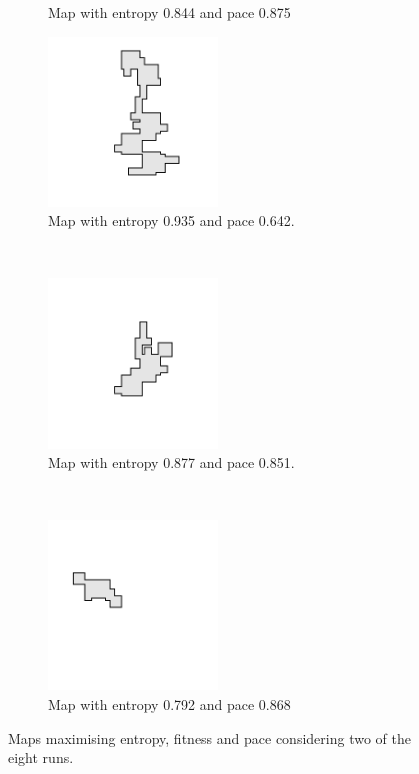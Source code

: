 \begin{figure}[hbtp]
\begin{subfigure}[t]{0.3\textwidth}
        \caption{Map with entropy 0.844 and pace 0.875}
        \label{fig:ex_two_best_pace_map_0}
    \end{subfigure}
    \centering
    \begin{subfigure}[t]{0.3\textwidth}
        \centering
        \includegraphics[height=4.5cm]{Images/images/experiment_two/best_entropy_pop_1/map.png}
        \caption{Map with entropy 0.935 and pace 0.642.}
        \label{fig:ex_two_best_entropy_map_1}
    \end{subfigure}%
    ~ 
    \begin{subfigure}[t]{0.3\textwidth}
        \centering
        \includegraphics[height=4.5cm]{Images/images/experiment_two/best_fitness_pop_1/map.png}
        \caption{Map with entropy 0.877 and pace 0.851.}
        \label{fig:ex_two_best_fitness_map_1}
    \end{subfigure}
    ~ 
    \begin{subfigure}[t]{0.3\textwidth}
        \centering
        \includegraphics[height=4.5cm]{Images/images/experiment_two/best_pace_pop_1/map.png}
        \caption{Map with entropy 0.792 and pace 0.868}
        \label{fig:ex_two_best_pace_map_1}
    \end{subfigure}
    \caption{Maps maximising entropy, fitness and pace considering two of the eight runs.}
    \label{fig:ex_two_maps}
\end{figure}


